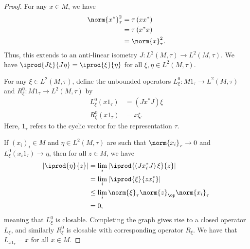 \documentclass[10pt]{mypackage}
\begin{document}
\begin{proof}
  For any $x\in M$, we have
  \begin{align*}
    \norm{x^{\ast}}_{\tau}^2 &= \tau\left( xx^{\ast} \right)\\
                             &= \tau\left( x^{\ast}x \right)\\
                             &= \norm{x}_{\tau}^2.
  \end{align*}
  Thus, this extends to an anti-linear isometry $J\colon L^2\left( M,\tau \right)\rightarrow L^2\left( M,\tau \right)$. We have $ \iprod{J\xi}{J\eta} = \iprod{\xi}{\eta} $ for all $\xi,\eta\in L^2\left( M,\tau \right)$.

  For any $\xi\in L^2\left( M,\tau \right)$, define the unbounded operators $L_{\xi}^{0}\colon M1_{\tau}\rightarrow L^2\left( M,\tau \right)$ and $R_{\xi}^{0}\colon M1_{\tau}\rightarrow L^2\left( M,\tau \right)$ by
  \begin{align*}
    L_{\xi}^0\left( x1_{\tau} \right) &= \left( Jx^{\ast}J \right)\xi\\
    R_{\xi}^{0}\left( x1_{\tau} \right) &= x\xi.
  \end{align*}
  Here, $1_{\tau}$ refers to the cyclic vector for the representation $\tau$.

  If $\left( x_i \right)_i\in M$ and $\eta\in L^2\left( M,\tau \right)$ are such that $\norm{x_i}_{\tau}\rightarrow 0$ and $L_{\xi}^0\left( x_i1_{\tau} \right)\rightarrow\eta$, then for all $z\in M$, we have
  \begin{align*}
    \left\vert \iprod{\eta}{z} \right\vert &= \lim_{i} \left\vert \iprod{\left( Jx_i^{\ast}J \right)\xi}{z} \right\vert\\
                                           &= \lim_{i} \left\vert \iprod{\xi}{zx_i^{\ast}} \right\vert\\
                                           &\leq \lim_{i} \norm{\xi}_{\tau}\norm{z}_{\op}\norm{x_i}_{\tau}\\
                                           &= 0,
  \end{align*}
  meaning that $L_{\xi}^0$ is closable. Completing the graph gives rise to a closed operator $L_{\xi}$, and similarly $R_{\xi}^0$ is closable with corresponding operator $R_{\xi}$. We have that $L_{x1_{\tau}} = x$ for all $x\in M$.


\end{proof}
\end{document}
